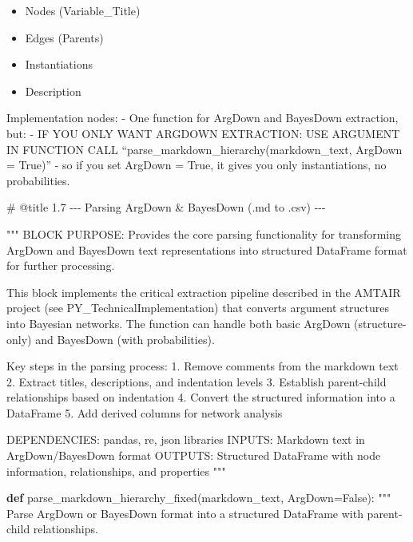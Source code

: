 \documentclass[
  11pt,
  letterpaper,
]{book}
\newenvironment{Shaded}{\begin{snugshade}}{\end{snugshade}}
\newcommand{\CommentTok}[1]{\textcolor[rgb]{0.37,0.37,0.37}{#1}}
\newcommand{\KeywordTok}[1]{\textcolor[rgb]{0.00,0.23,0.31}{\textbf{#1}}}
\newcommand{\NormalTok}[1]{\textcolor[rgb]{0.00,0.23,0.31}{#1}}
\newcommand{\OperatorTok}[1]{\textcolor[rgb]{0.37,0.37,0.37}{#1}}
\newcommand{\VariableTok}[1]{\textcolor[rgb]{0.07,0.07,0.07}{#1}}
\providecommand{\tightlist}{%
  \setlength{\itemsep}{0pt}\setlength{\parskip}{0pt}}
\begin{document}
\begin{itemize}
\tightlist
\item
  Nodes (Variable\_Title)
\item
  Edges (Parents)
\item
  Instantiations
\item
  Description
\end{itemize}

Implementation nodes: - One function for ArgDown and BayesDown
extraction, but: - IF YOU ONLY WANT ARGDOWN EXTRACTION: USE ARGUMENT IN
FUNCTION CALL ``parse\_markdown\_hierarchy(markdown\_text, ArgDown =
True)'' - so if you set ArgDown = True, it gives you only
instantiations, no probabilities.

\begin{Shaded}
\begin{Highlighting}[]
\CommentTok{\# @title 1.7 {-}{-}{-} Parsing ArgDown \& BayesDown (.md to .csv) {-}{-}{-}}

\CommentTok{"""}
\CommentTok{BLOCK PURPOSE: Provides the core parsing functionality for transforming ArgDown and BayesDown}
\CommentTok{text representations into structured DataFrame format for further processing.}

\CommentTok{This block implements the critical extraction pipeline described in the AMTAIR project}
\CommentTok{(see PY\_TechnicalImplementation) that converts argument structures into Bayesian networks.}
\CommentTok{The function can handle both basic ArgDown (structure{-}only) and BayesDown (with probabilities).}

\CommentTok{Key steps in the parsing process:}
\CommentTok{1. Remove comments from the markdown text}
\CommentTok{2. Extract titles, descriptions, and indentation levels}
\CommentTok{3. Establish parent{-}child relationships based on indentation}
\CommentTok{4. Convert the structured information into a DataFrame}
\CommentTok{5. Add derived columns for network analysis}

\CommentTok{DEPENDENCIES: pandas, re, json libraries}
\CommentTok{INPUTS: Markdown text in ArgDown/BayesDown format}
\CommentTok{OUTPUTS: Structured DataFrame with node information, relationships, and properties}
\CommentTok{"""}

\KeywordTok{def}\NormalTok{ parse\_markdown\_hierarchy\_fixed(markdown\_text, ArgDown}\OperatorTok{=}\VariableTok{False}\NormalTok{):}
    \CommentTok{"""}
\CommentTok{    Parse ArgDown or BayesDown format into a structured DataFrame with parent{-}child relationships.}


\end{Highlighting}
\end{Shaded}
\end{document}
